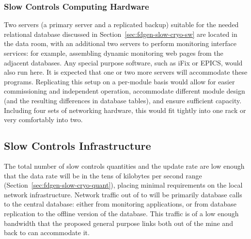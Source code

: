 \subsubsection{Slow Controls Computing Hardware}
\label{sec:fdgen-slow-cryo-slow-compute}

Two servers (a primary server and a replicated backup) suitable for the needed relational database discussed
in Section~\ref{sec:fdgen-slow-cryo-sw} are located in the  data
room, with an additional
two servers to perform  monitoring interface services: for
example, assembling dynamic  monitoring web pages from the adjacent
databases.  Any special purpose software, such as iFix or EPICS, would
also run here. It is expected that one or two more servers will accommodate
these programs.
Replicating this setup on a per-module basis would allow for easier
commissioning and independent operation, accommodate different module
design (and the resulting differences in database tables), and ensure
sufficient capacity.  Including four sets of networking hardware, this
would fit tightly into one rack or very comfortably into two.





\subsection{Slow Controls Infrastructure}
\label{sec:fdgen-slow-cryo-slow-infra}

The total number of slow controls quantities and the update rate are low enough
that the data rate will be in the tens of kilobytes per second range
(Section~\ref{sec:fdgen-slow-cryo-quant}), placing minimal requirements
on the local network infrastructure.
Network traffic out of \surf to \fnal will be primarily database calls
to the central  database: either from monitoring applications, or from
database replication to the offline version of the  database.  This
traffic is of a low enough bandwidth that the proposed general purpose
links both out of the mine and back to \fnal can accommodate it.


